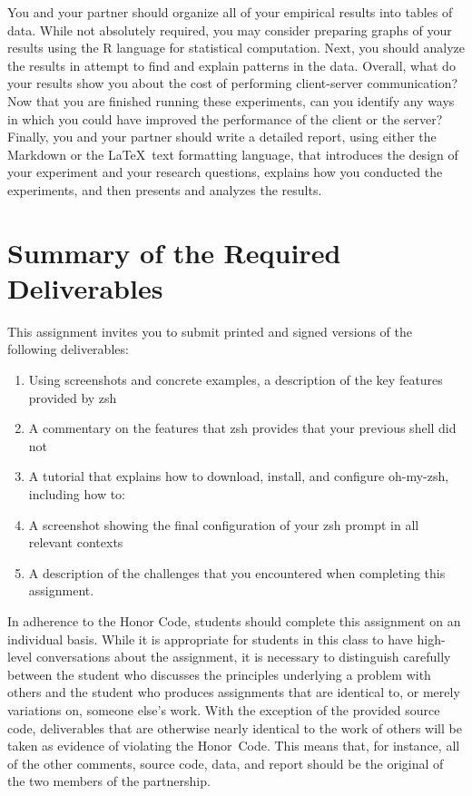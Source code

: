 You and your partner should organize all of your empirical results into tables of data. While not absolutely required,
you may consider preparing graphs of your results using the R language for statistical computation. Next, you should
analyze the results in attempt to find and explain patterns in the data. Overall, what do your results show you about
the cost of performing client-server communication? Now that you are finished running these experiments, can you
identify any ways in which you could have improved the performance of the client or the server? Finally, you and your
partner should write a detailed report, using either the Markdown or the \LaTeX~text formatting language, that
introduces the design of your experiment and your research questions, explains how you conducted the experiments, and
then presents and analyzes the results.

\section*{Summary of the Required Deliverables}

This assignment invites you to submit printed and signed versions of the following deliverables:

\begin{enumerate}

    \item Using screenshots and concrete examples, a description of the key features provided by zsh

    \item A commentary on the features that zsh provides that your previous shell did not

    \item A tutorial that explains how to download, install, and configure oh-my-zsh, including how to:

    \item A screenshot showing the final configuration of your zsh prompt in all relevant contexts

    \item A description of the challenges that you encountered when completing this assignment.

\end{enumerate}

In adherence to the Honor Code, students should complete this assignment on an individual basis. While it is appropriate
for students in this class to have high-level conversations about the assignment, it is necessary to distinguish
carefully between the student who discusses the principles underlying a problem with others and the student who produces
assignments that are identical to, or merely variations on, someone else's work.  With the exception of the provided
source code, deliverables that are otherwise nearly identical to the work of others will be taken as evidence of violating the
\mbox{Honor Code}. This means that, for instance, all of the other comments, source code, data, and report should be the
original of the two members of the partnership.


